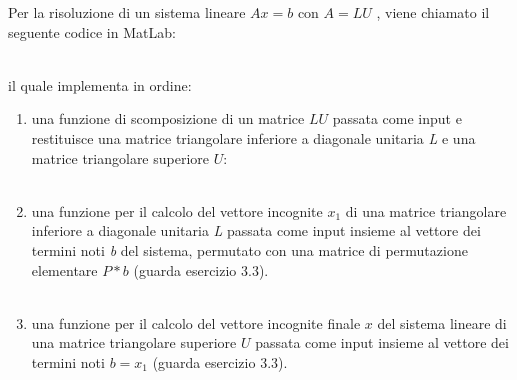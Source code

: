Per la risoluzione di un sistema lineare $Ax=b$ con $A=LU$ , viene chiamato il seguente codice in MatLab:\\\

il quale implementa in ordine:
\begin{enumerate}
\item
una funzione di scomposizione di un matrice $LU$ passata come input e restituisce una matrice triangolare inferiore a diagonale unitaria \textit{L} e una matrice triangolare superiore $U$:\\\

\item
una funzione per il calcolo del vettore incognite $x_1$ di una matrice triangolare inferiore a diagonale unitaria \textit{L} passata come input insieme al vettore dei termini noti \textit{b} del sistema, permutato con una matrice di permutazione elementare $P*b$ (guarda esercizio 3.3). \\\
\item
una funzione per il calcolo del vettore incognite finale $x$ del sistema lineare di una matrice triangolare superiore $U$ passata come input insieme al vettore dei termini noti $b=x_1$ (guarda esercizio 3.3).\\\
\end{enumerate}